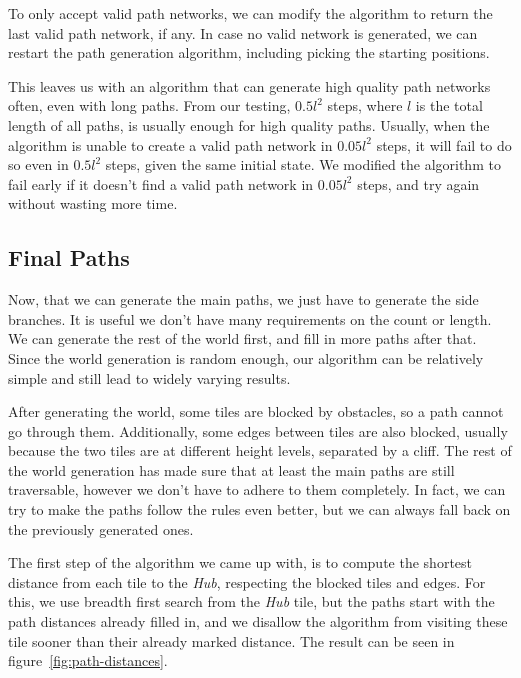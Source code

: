 To only accept valid path networks, we can modify the algorithm to return the last valid path network, if any.
In case no valid network is generated, we can restart the path generation algorithm, including picking the starting positions.

This leaves us with an algorithm that can generate high quality path networks often, even with long paths.
From our testing, $0.5l^2$ steps, where $l$ is the total length of all paths, is usually enough for high quality paths.
Usually, when the algorithm is unable to create a valid path network in $0.05l^2$ steps, it will fail to do so even in $0.5l^2$ steps, given the same initial state.
We modified the algorithm to fail early if it doesn't find a valid path network in $0.05l^2$ steps, and try again without wasting more time.

\subsection{Final Paths}

Now, that we can generate the main paths, we just have to generate the side branches.
It is useful we don't have many requirements on the count or length.
We can generate the rest of the world first, and fill in more paths after that.
Since the world generation is random enough, our algorithm can be relatively simple and still lead to widely varying results.

After generating the world, some tiles are blocked by obstacles, so a path cannot go through them.
Additionally, some edges between tiles are also blocked, usually because the two tiles are at different height levels, separated by a cliff.
The rest of the world generation has made sure that at least the main paths are still traversable, however we don't have to adhere to them completely.
In fact, we can try to make the paths follow the rules even better, but we can always fall back on the previously generated ones.

The first step of the algorithm we came up with, is to compute the shortest distance from each tile to the \emph{Hub}, respecting the blocked tiles and edges.
For this, we use breadth first search from the \emph{Hub} tile, but the paths start with the path distances already filled in, and we disallow the algorithm from visiting these tile sooner than their already marked distance.
The result can be seen in figure~\ref{fig:path-distances}.

